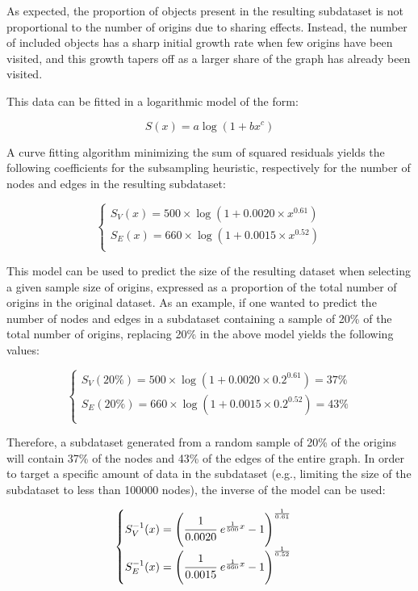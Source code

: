 As expected, the proportion of objects present in the resulting subdataset is
not proportional to the number of origins due to sharing effects. Instead,
the number of included objects has a sharp initial growth rate when few origins
have been visited, and this growth tapers off as a larger share of the graph
has already been visited.

This data can be fitted in a logarithmic model of the form:

\[S(x) = a \log(1+bx^c)\]

A curve fitting algorithm minimizing the sum of squared residuals yields the
following coefficients for the subsampling heuristic, respectively for the
number of nodes and edges in the resulting subdataset:

\[
\begin{cases}
    S_V(x) = 500 \times \log(1 + 0.0020 \times x ^{0.61}) \\
    S_E(x) = 660 \times \log(1 + 0.0015 \times x ^{0.52}) \\
\end{cases}
\]

This model can be used to predict the size of the resulting dataset when
selecting a given sample size of origins, expressed as a proportion of the
total number of origins in the original dataset. As an example, if one wanted
to predict the number of nodes and edges in a subdataset containing a sample of
20\% of the total number of origins, replacing 20\% in the above model
yields the following values:

\[
\begin{cases}
    S_V(20\%) = 500 \times \log(1 + 0.0020 \times 0.2 ^{0.61}) = 37\% \\
    S_E(20\%) = 660 \times \log(1 + 0.0015 \times 0.2 ^{0.52}) = 43\% \\
\end{cases}
\]

Therefore, a subdataset generated from a random sample of 20\% of the origins
will contain 37\% of the nodes and 43\% of the edges of the entire graph.
In order to target a specific amount of data in the subdataset (e.g., limiting
the size of the subdataset to less than \num{100000} nodes), the inverse of the
model can be used:

\[
\begin{cases}
    S_V^{-1}(x) = {\left(\cfrac{1}{0.0020}~e^{\frac{1}{500}x}-1\right)}^{\frac{1}{0.61}} \\
    S_E^{-1}(x) = {\left(\cfrac{1}{0.0015}~e^{\frac{1}{660}x}-1\right)}^{\frac{1}{0.52}} \\
\end{cases}
\]

